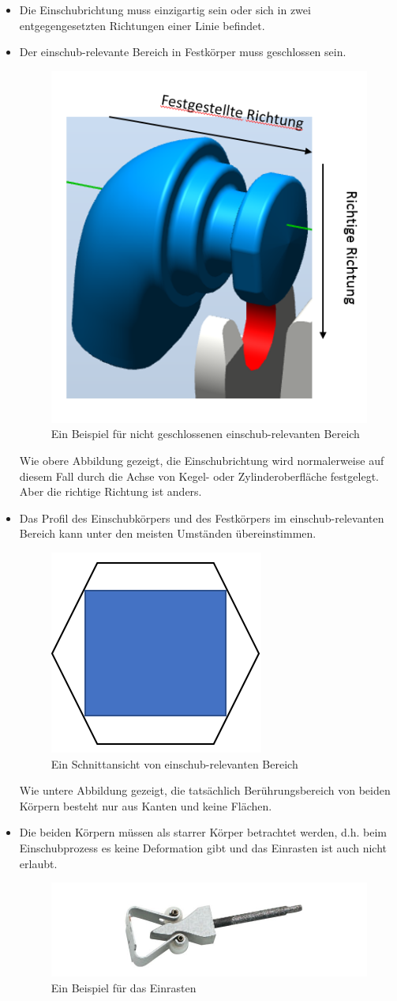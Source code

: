 \documentclass[14pt,a4paper,titlepage]{article}
\begin{document}
		\begin{itemize}
			\item Die Einschubrichtung muss einzigartig sein oder sich in zwei entgegengesetzten Richtungen einer Linie befindet.  
			\item Der einschub-relevante Bereich in Festkörper muss geschlossen sein.\\
			\begin{figure}[h!]
				\centering
				\includegraphics[width=0.3\linewidth]{notclosedarea.png}
				\caption{Ein Beispiel für nicht geschlossenen einschub-relevanten Bereich}
			\end{figure}
			Wie obere Abbildung gezeigt, die Einschubrichtung wird normalerweise auf diesem Fall durch die Achse von Kegel- oder Zylinderoberfläche festgelegt. Aber die richtige Richtung ist anders.
			\item 
			Das Profil des Einschubkörpers und des Festkörpers im einschub-relevanten Bereich kann unter den meisten Umständen übereinstimmen.\\
				\begin{figure}[h!]
				\centering
				\includegraphics[width=0.3\linewidth]{differentprofile.png}
				\caption{Ein Schnittansicht von einschub-relevanten Bereich}
				\end{figure} 
			Wie untere Abbildung gezeigt, die tatsächlich Berührungsbereich von beiden Körpern besteht nur aus Kanten und keine Flächen. 
			\item Die beiden Körpern müssen als starrer Körper betrachtet werden, d.h. beim Einschubprozess es keine Deformation gibt und das Einrasten ist auch nicht erlaubt. 
			\begin{figure}[h!]
				\centering
				\includegraphics[width=0.5\linewidth]{einrasten.png}
				\caption{Ein Beispiel für das Einrasten}
			\end{figure}
		\end{itemize}
\end{document}
